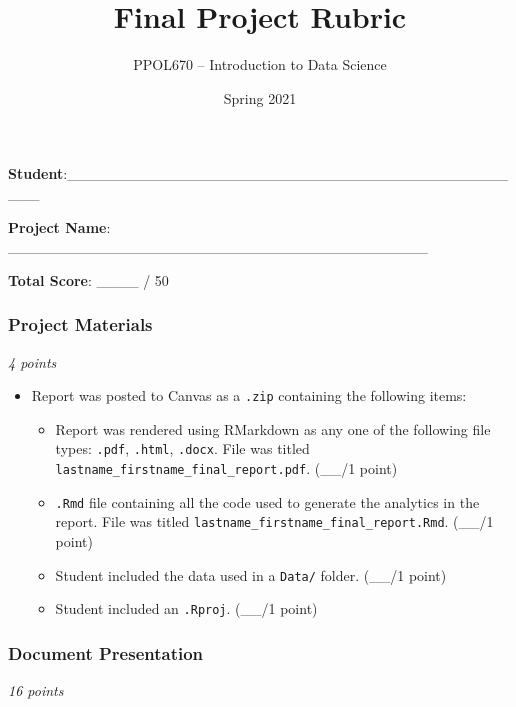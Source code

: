 \documentclass[
  11pt,
]{article}
\title{\textbf{Final Project Rubric}}
\author{\Large PPOL670 -- Introduction to Data Science}
\date{Spring 2021}
\providecommand{\tightlist}{%
  \setlength{\itemsep}{0pt}\setlength{\parskip}{0pt}}
\begin{document}
\maketitle

\textbf{Student}:\_\_\_\_\_\_\_\_\_\_\_\_\_\_\_\_\_\_\_\_\_\_\_\_\_\_\_\_\_\_\_\_\_\_\_\_\_\_\_\_\_\_\_\_\_

\textbf{Project Name}:
\_\_\_\_\_\_\_\_\_\_\_\_\_\_\_\_\_\_\_\_\_\_\_\_\_\_\_\_\_\_\_\_\_\_\_\_\_\_\_\_

\textbf{Total Score}: \_\_\_\_ / 50

\hypertarget{project-materials}{%
\subsubsection{Project Materials}\label{project-materials}}

\emph{4 points}

\begin{itemize}
\tightlist
\item
  Report was posted to Canvas as a \texttt{.zip} containing the
  following items:

  \begin{itemize}
  \tightlist
  \item
    Report was rendered using RMarkdown as any one of the following file
    types: \texttt{.pdf}, \texttt{.html}, \texttt{.docx}. File was
    titled \texttt{lastname\_firstname\_final\_report.pdf}. (\_\_/1
    point)
  \item
    \texttt{.Rmd} file containing all the code used to generate the
    analytics in the report. File was titled
    \texttt{lastname\_firstname\_final\_report.Rmd}. (\_\_/1 point)
  \item
    Student included the data used in a \texttt{Data/} folder. (\_\_/1
    point)
  \item
    Student included an \texttt{.Rproj}. (\_\_/1 point)
  \end{itemize}
\end{itemize}

\hypertarget{document-presentation}{%
\subsubsection{Document Presentation}\label{document-presentation}}

\emph{16 points}
\end{document}
